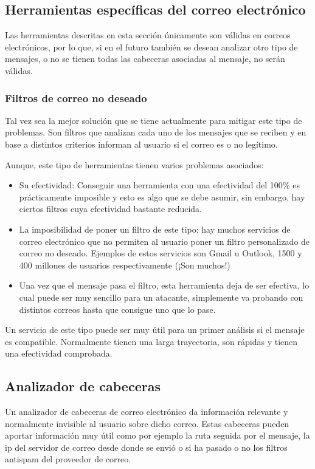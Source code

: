 \subsection{Herramientas específicas del correo electrónico}
Las herramientas descritas en esta sección únicamente son válidas en correos electrónicos, por lo que, si en el futuro también se desean analizar otro tipo de mensajes, o no se tienen todas las cabeceras asociadas al mensaje, no serán válidas.

\subsubsection{Filtros de correo no deseado}
Tal vez sea la mejor solución que se tiene actualmente para mitigar este tipo de problemas. Son filtros que analizan cada uno de los mensajes que se reciben y en base a distintos criterios informan al usuario si el correo es o no legítimo.

Aunque, este tipo de herramientas tienen varios problemas asociados:

\begin{itemize}
    \item Su efectividad: Conseguir una herramienta con una efectividad del 100\% es prácticamente imposible y esto es algo que se debe asumir, sin embargo, hay ciertos filtros cuya efectividad bastante reducida.
    \item La imposibilidad de poner un filtro de este tipo: hay muchos servicios de correo electrónico que no permiten al usuario poner un filtro personalizado de correo no deseado. Ejemplos de estos servicios son Gmail u Outlook,  1500 \cite{usuarios_gmail} y 400 \cite{usuarios_hotmail} millones de usuarios respectivamente (¡Son muchos!)
    \item Una vez que el mensaje pasa el filtro, esta herramienta deja de ser efectiva, lo cual puede ser muy sencillo para un atacante, simplemente va probando con distintos correos hasta que consigue uno que lo pase. 
\end{itemize}

Un servicio de este tipo puede ser muy útil para un primer análisis si el mensaje es compatible. Normalmente tienen una larga trayectoria, son rápidas y tienen una efectividad comprobada.

\subsection{Analizador de cabeceras}
Un analizador de cabeceras de correo electrónico da información relevante y normalmente invisible al usuario sobre dicho correo. Estas cabeceras pueden aportar información muy útil como por ejemplo la ruta seguida por el mensaje, la ip del servidor de correo desde donde se envió o si ha pasado o no los filtros antispam del proveedor de correo. 

